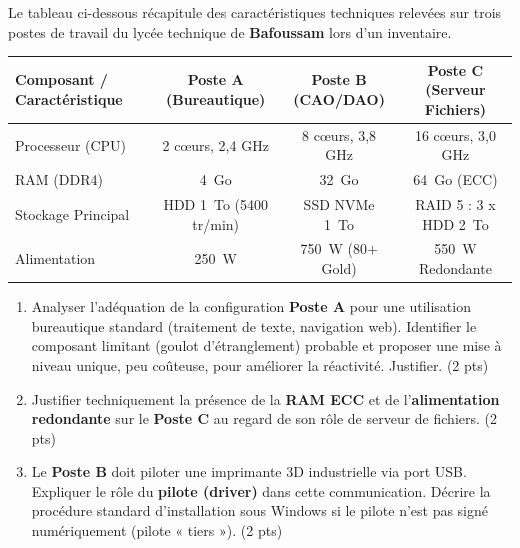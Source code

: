 \documentclass[11pt]{article}
\begin{document}
\begin{exercice}
Le tableau ci-dessous récapitule des caractéristiques techniques relevées sur trois postes de travail du lycée technique de \textbf{Bafoussam} lors d'un inventaire.

\begin{tabularx}{\linewidth}{|X|c|c|c|}
\hline
\textbf{Composant / Caractéristique} & \textbf{Poste A (Bureautique)} & \textbf{Poste B (CAO/DAO)} & \textbf{Poste C (Serveur Fichiers)} \\
\hline
Processeur (CPU) & 2 cœurs, 2,4 GHz & 8 cœurs, 3,8 GHz & 16 cœurs, 3,0 GHz \\
RAM (DDR4) & \SI{4}{Go} & \SI{32}{Go} & \SI{64}{Go} (ECC) \\
Stockage Principal & HDD \SI{1}{To} (5400 tr/min) & SSD NVMe \SI{1}{To} & RAID 5 : 3 x HDD \SI{2}{To} \\
Alimentation & \SI{250}{W} & \SI{750}{W} (80+ Gold) & \SI{550}{W} Redondante \\
\hline
\end{tabularx}

\begin{enumerate}
    \item Analyser l'adéquation de la configuration \textbf{Poste A} pour une utilisation bureautique standard (traitement de texte, navigation web). Identifier le composant limitant (goulot d'étranglement) probable et proposer une mise à niveau unique, peu coûteuse, pour améliorer la réactivité. Justifier. (2 pts)
    \item Justifier techniquement la présence de la \textbf{RAM ECC} et de l'\textbf{alimentation redondante} sur le \textbf{Poste C} au regard de son rôle de serveur de fichiers. (2 pts)
    \item Le \textbf{Poste B} doit piloter une imprimante 3D industrielle via port USB. Expliquer le rôle du \textbf{pilote (driver)} dans cette communication. Décrire la procédure standard d'installation sous Windows si le pilote n'est pas signé numériquement (pilote « tiers »). (2 pts)
\end{enumerate}
\end{exercice}
\end{document}
